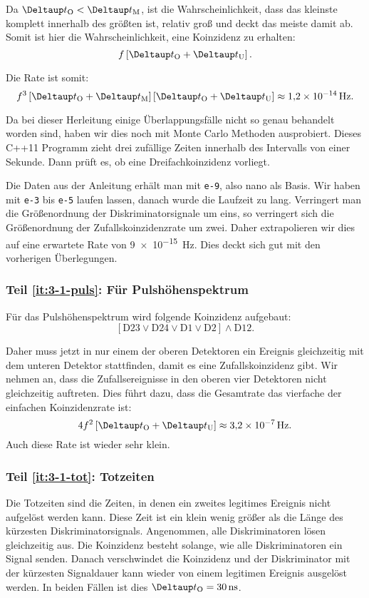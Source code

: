\documentclass[11pt, ngerman, fleqn, DIV=15, headinclude, BCOR=2cm]{scrreprt}
\begin{document}
Da $\DtO < \DtM$, ist die Wahrscheinlichkeit, dass das kleinste komplett
innerhalb des größten ist, relativ groß und deckt das meiste damit ab. Somit
ist hier die Wahrscheinlichkeit, eine Koinzidenz zu erhalten:
\[
    f \sbr{\DtO + \DtU}.
\]

Die Rate ist somit:
\[
    f^3 \sbr{\DtO + \DtM} \sbr{\DtO + \DtU} \approx \SI{1.2e-14}{\hertz}.
\]

Da bei dieser Herleitung einige Überlappungsfälle nicht so genau behandelt
worden sind, haben wir dies noch mit Monte Carlo Methoden ausprobiert. Dieses
C++11 Programm zieht drei zufällige Zeiten innerhalb des Intervalls von einer
Sekunde. Dann prüft es, ob eine Dreifachkoinzidenz vorliegt.



Die Daten aus der Anleitung erhält man mit \texttt{e-9}, also nano als Basis.
Wir haben mit \texttt{e-3} bis \texttt{e-5} laufen lassen, danach wurde die
Laufzeit zu lang. Verringert man die Größenordnung der Diskriminatorsignale um
eins, so verringert sich die Größenordnung der Zufallskoinzidenzrate um zwei.
Daher extrapolieren wir dies auf eine erwartete Rate von \SI{9e-15}{\hertz}.
Dies deckt sich gut mit den vorherigen Überlegungen.

\subsubsection{Teil \ref{it:3-1-puls}: Für Pulshöhenspektrum}

Für das Pulshöhenspektrum wird folgende Koinzidenz aufgebaut:
\[
    [\mathrm D23 \lor \mathrm D24 \lor \mathrm D1 \lor \mathrm D2] \land
    \mathrm D12.
\]

Daher muss jetzt in nur einem der oberen Detektoren ein Ereignis gleichzeitig
mit dem unteren Detektor stattfinden, damit es eine Zufallskoinzidenz gibt. Wir
nehmen an, dass die Zufallsereignisse in den oberen vier Detektoren nicht
gleichzeitig auftreten. Dies führt dazu, dass die Gesamtrate das vierfache der
einfachen Koinzidenzrate ist:
\[
    4 f^2 \sbr{\DtO + \DtU} \approx \SI{3.2e-7}{\hertz}.
\]
Auch diese Rate ist wieder sehr klein.

\subsubsection{Teil \ref{it:3-1-tot}: Totzeiten}

Die Totzeiten sind die Zeiten, in denen ein zweites legitimes Ereignis nicht
aufgelöst werden kann. Diese Zeit ist ein klein wenig größer als die Länge des
kürzesten Diskriminatorsignals. Angenommen, alle Diskriminatoren lösen
gleichzeitig aus. Die Koinzidenz besteht solange, wie alle Diskriminatoren ein
Signal senden. Danach verschwindet die Koinzidenz und der Diskriminator mit der
kürzesten Signaldauer kann wieder von einem legitimen Ereignis ausgelöst
werden. In beiden Fällen ist dies $\DtO = \SI{30}{\nano\second}$.
\end{document}
